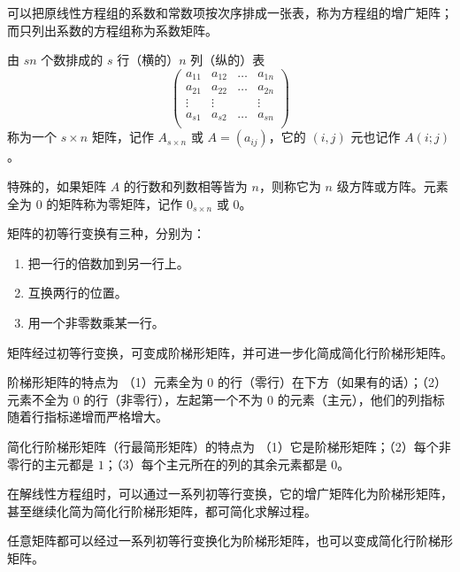 可以把原线性方程组的系数和常数项按次序排成一张表，称为方程组的增广矩阵；而只列出系数的方程组称为系数矩阵。

\begin{definition}
	由 $sn$ 个数排成的 $s$ 行（横的）$n$ 列（纵的）表
	\begin{equation*}
		\left(
		\begin{matrix}
			a_{11} & a_{12} & \ldots & a_{1n} \\
			a_{21} & a_{22} & \ldots & a_{2n} \\
			\vdots & \vdots &        & \vdots \\a_{s1}&a_{s2}&\ldots&a_{sn}\\
		\end{matrix}
		\right)
	\end{equation*}
	称为一个 $s\times n$ 矩阵，记作 $A_{s\times n}$ 或 $A=(a_{ij})$，它的 $(i,j)$ 元也记作 $A(i;j)$。
\end{definition}

特殊的，如果矩阵 $A$ 的行数和列数相等皆为 $n$，则称它为 $n$ 级方阵或方阵。元素全为 $0$ 的矩阵称为零矩阵，记作 $0_{s\times n}$ 或 $0$。

\begin{definition}[初等行变换]
	矩阵的初等行变换有三种，分别为：

	\begin{enumerate}
		\item 把一行的倍数加到另一行上。
		\item 互换两行的位置。
		\item 用一个非零数乘某一行。
	\end{enumerate}
\end{definition}

矩阵经过初等行变换，可变成阶梯形矩阵，并可进一步化简成简化行阶梯形矩阵。

阶梯形矩阵的特点为 （1）元素全为 $0$ 的行（零行）在下方（如果有的话）；（2）元素不全为 $0$ 的行（非零行），左起第一个不为 $0$ 的元素（主元），他们的列指标随着行指标递增而严格增大。

简化行阶梯形矩阵（行最简形矩阵）的特点为 （1）它是阶梯形矩阵；（2）每个非零行的主元都是 $1$；（3）每个主元所在的列的其余元素都是 $0$。

在解线性方程组时，可以通过一系列初等行变换，它的增广矩阵化为阶梯形矩阵，甚至继续化简为简化行阶梯形矩阵，都可简化求解过程。

\begin{theorem}
	任意矩阵都可以经过一系列初等行变换化为阶梯形矩阵，也可以变成简化行阶梯形矩阵。
\end{theorem}

